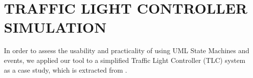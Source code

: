 \section{\uppercase{Traffic Light Controller simulation}}
\label{sec:casestudy}
In order to assess the usability and practicality of using UML State Machines and events, we applied our tool to a simplified Traffic Light Controller (TLC) system as a case study, which is extracted from \cite{katz2005contemporary}.



%